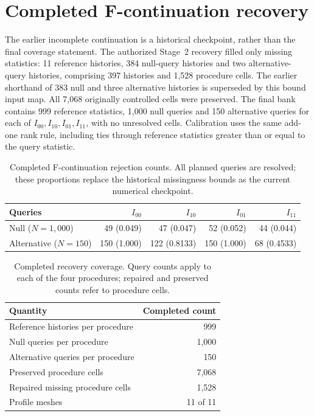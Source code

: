 \section{Completed F-continuation recovery}
The earlier incomplete continuation is a historical checkpoint, rather than
the final coverage statement. The authorized Stage~2 recovery filled only
missing statistics: 11 reference histories, 384 null-query histories and two
alternative-query histories, comprising 397 histories and 1,528 procedure
cells. The earlier shorthand of 383 null and three alternative histories is
superseded by this bound input map. All 7,068 originally controlled cells
were preserved. The final bank contains 999 reference statistics, 1,000 null
queries and 150 alternative queries for each of $I_{00},I_{10},I_{01},I_{11}$,
with no unresolved cells. Calibration uses the same add-one rank rule,
including ties through reference statistics greater than or equal to the
query statistic.

\begin{table}[htbp]\centering
\caption{Completed F-continuation rejection counts. All planned queries are
resolved; these proportions replace the historical missingness bounds as
the current numerical checkpoint.}\label{tab:f-stage2-completed}\label{tab:f-continuation}
\begin{tabular}{lrrrr}\toprule
Queries & $I_{00}$ & $I_{10}$ & $I_{01}$ & $I_{11}$\\\midrule
Null ($N=1{,}000$) & 49 (0.049) & 47 (0.047) & 52 (0.052) & 44 (0.044)\\
Alternative ($N=150$) & 150 (1.000) & 122 (0.8133) & 150 (1.000) & 68 (0.4533)\\\bottomrule
\end{tabular}\end{table}

\begin{table}[htbp]\centering
\caption{Completed recovery coverage. Query counts apply to each of the four procedures; repaired and preserved counts refer to procedure cells.}\label{tab:f-recovery-coverage}
\begin{tabular}{lr}\toprule
Quantity & Completed count\\\midrule
Reference histories per procedure & 999\\
Null queries per procedure & 1,000\\
Alternative queries per procedure & 150\\
Preserved procedure cells & 7,068\\
Repaired missing procedure cells & 1,528\\
Profile meshes & 11 of 11\\\bottomrule
\end{tabular}\end{table}

